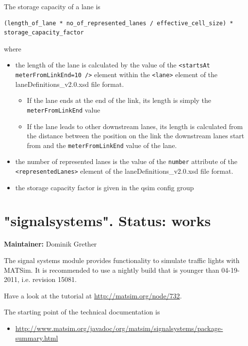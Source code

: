 The storage capacity of a lane is

\begin{verbatim}
(length_of_lane * no_of_represented_lanes / effective_cell_size) * storage_capacity_factor
\end{verbatim}

where
\begin{itemize}
	\item the length of the lane is calculated by the value of the \verb$<startsAt meterFromLinkEnd=10 />$ element within the \verb$<lane>$ element of the laneDefinitions\_v2.0.xsd file format. \\
		\begin{itemize}
			\item If the lane ends at the end of the link, its length is simply the \verb$meterFromLinkEnd$ value
			\item If the lane leads to other downstream lanes, its length is calculated from the distance between the position on the link the downstream lanes start from and the \verb$meterFromLinkEnd$ value of the lane. 
		\end{itemize}
	\item the number of represented lanes is the value of the \verb$number$ attribute of the  \verb$<representedLanes>$ element of the laneDefinitions\_v2.0.xsd file format.
	\item the storage capacity factor is given in the qsim config group
\end{itemize}


\vfill\eject
\section{"signalsystems". Status: works}

\textbf{Maintainer:} Dominik Grether

The signal systems module provides functionality to simulate traffic  lights with MATSim. It is recommended to use a nightly build that is  younger than 04-19-2011, i.e. revision 15081.

Have a look at the tutorial at \href{http://matsim.org/node/732}{http://matsim.org/node/732}.

The starting point of the technical documentation is
\begin{itemize}
	\item \href{http://www.matsim.org/javadoc/org/matsim/signalsystems/package-summary.html}{http://www.matsim.org/javadoc/org/matsim/signalsystems/package-summary.html}
\end{itemize}

